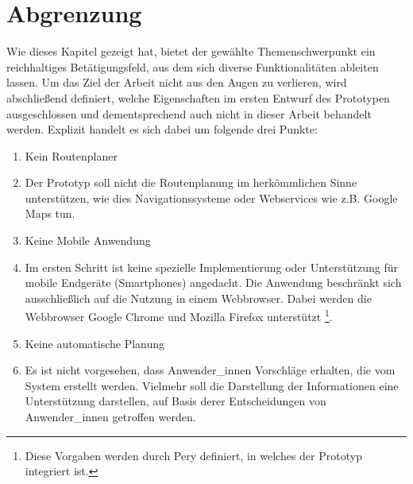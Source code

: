 \documentclass[Bachelorarbeit.tex]{subfiles}
\begin{document}
\section{Abgrenzung}
Wie dieses Kapitel gezeigt hat, bietet der gewählte Themenschwerpunkt ein reichhaltiges Betätigungsfeld, aus dem sich diverse Funktionalitäten ableiten lassen. 
Um das Ziel der Arbeit nicht aus den Augen zu verlieren, wird abschließend definiert, welche Eigenschaften im ersten Entwurf des Prototypen ausgeschlossen und dementsprechend auch nicht in dieser Arbeit behandelt werden. 
Explizit handelt es sich dabei um folgende drei Punkte:
\begin{enumerate}
	\item Kein Routenplaner
	\item[] Der Prototyp soll nicht die Routenplanung im herkömmlichen Sinne unterstützen, wie dies Navigationssysteme oder Webservices wie z.B. Google Maps tun.
	\item Keine Mobile Anwendung
	\item [] Im ersten Schritt ist keine spezielle Implementierung oder Unterstützung für mobile Endgeräte (Smartphones) angedacht. Die Anwendung beschränkt sich ausschließlich auf die Nutzung in einem Webbrowser. Dabei werden die Webbrowser Google Chrome und Mozilla Firefox unterstützt \footnote{Diese Vorgaben werden durch Pery definiert, in welches der Prototyp integriert ist.}.
	\item Keine automatische Planung
	\item[] Es ist nicht vorgesehen, dass Anwender\_innen Vorschläge erhalten, die vom System erstellt werden. Vielmehr soll die Darstellung der Informationen eine Unterstützung darstellen, auf Basis derer Entscheidungen von Anwender\_innen getroffen werden.
\end{enumerate}
\end{document}
